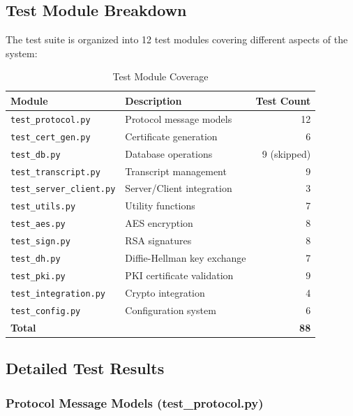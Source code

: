 \documentclass[runningheads]{llncs}
\begin{document}
\subsection{Test Module Breakdown}

The test suite is organized into 12 test modules covering different aspects of the system:

\begin{table}[h]
\centering
\begin{tabular}{@{}llr@{}}
\toprule
\textbf{Module} & \textbf{Description} & \textbf{Test Count} \\
\midrule
\texttt{test\_protocol.py} & Protocol message models & 12 \\
\texttt{test\_cert\_gen.py} & Certificate generation & 6 \\
\texttt{test\_db.py} & Database operations & 9 (skipped) \\
\texttt{test\_transcript.py} & Transcript management & 9 \\
\texttt{test\_server\_client.py} & Server/Client integration & 3 \\
\texttt{test\_utils.py} & Utility functions & 7 \\
\texttt{test\_aes.py} & AES encryption & 8 \\
\texttt{test\_sign.py} & RSA signatures & 8 \\
\texttt{test\_dh.py} & Diffie-Hellman key exchange & 7 \\
\texttt{test\_pki.py} & PKI certificate validation & 9 \\
\texttt{test\_integration.py} & Crypto integration & 4 \\
\texttt{test\_config.py} & Configuration system & 6 \\
\bottomrule
\textbf{Total} & & \textbf{88} \\
\bottomrule
\end{tabular}
\caption{Test Module Coverage}
\label{tab:test-modules}
\end{table}

\subsection{Detailed Test Results}

\subsubsection{Protocol Message Models (test\_protocol.py)}
\end{document}
